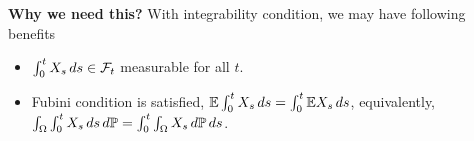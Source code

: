 {\textbf{Why we need this?}}
With integrability condition, we may have following benefits
\begin{itemize}
    \item $\int_0^t X_s \mathop{}\!d s \in \mathcal{F}_t$ measurable for all $t$.
    \item Fubini condition is satisfied, $\mathbb{E} \int_0^t X_s \mathop{}\!d s = \int_0^t \mathbb{E} X_s \mathop{}\!d s$, equivalently, $\int_{\Omega} \int_0^t X_s \mathop{}\!d s\mathop{}\!d \mathbb{P} = \int_0^t \int_{\Omega} X_s \mathop{}\!d \mathbb{P}\mathop{}\!d s $.
\end{itemize}


